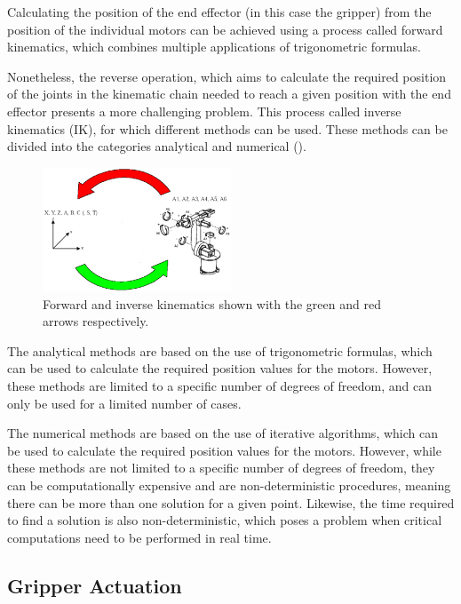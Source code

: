 Calculating the position of the end effector (in this case the gripper) from the position of the individual motors can be achieved using a process called forward kinematics, which combines multiple applications of trigonometric formulas.

Nonetheless, the reverse operation, which aims to calculate the required position of the joints in the kinematic chain needed to reach a given position with the end effector presents a more challenging problem. 
This process called inverse kinematics (IK), for which different methods can be used. These methods can be divided into the categories analytical and numerical (). \autocite{robotik}

\begin{figure}[!h]
    \centering
    \includegraphics[width=0.5\textwidth]{Figures/fk_vs_ik.png}
    \caption{Forward and inverse kinematics shown with the green and red arrows respectively.}
    \label{fig:fkik}
\end{figure}

The analytical methods are based on the use of trigonometric formulas, which can be used to calculate the required position values for the motors. However, these methods are limited to a specific number of degrees of freedom, and can only be used for a limited number of cases.

The numerical methods are based on the use of iterative algorithms, which can be used to calculate the required position values for the motors. However, while these methods are not limited to a specific number of degrees of freedom, they can be computationally expensive and are non-deterministic procedures, meaning there can be more than one solution for a given point. Likewise, the time required to find a solution is also non-deterministic, which poses a problem when critical computations need to be performed in real time.


\subsection{Gripper Actuation}

